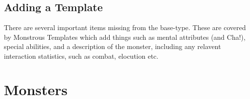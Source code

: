 \documentclass[twoside]{book}
\begin{document}
    

\subsection{Adding a Template}
    
    {  
    There are several important items missing from the
               base-type. These are covered by Monstrous Templates which
               add things such as mental attributes (and Cha!), special
               abilities, and a description of the monster, including any
               relavent interaction statistics, such as combat, elocution
               etc. 
    }
  
    

\section{Monsters}
    
\end{document}
